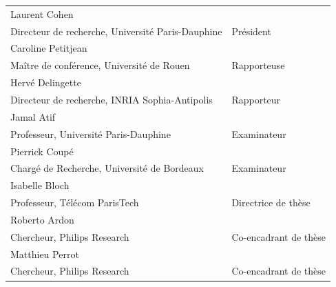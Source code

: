 \documentclass[a4paper]{article}
\newcommand{\jurynameA}{Laurent Cohen}
\newcommand{\juryadressA}{Directeur de recherche, Université Paris-Dauphine}
\newcommand{\juryroleA}{Président}
\newcommand{\jurynameB}{Caroline Petitjean}
\newcommand{\juryadressB}{Maître de conférence, Université de Rouen}
\newcommand{\juryroleB}{Rapporteuse}
\newcommand{\jurynameC}{Hervé Delingette}
\newcommand{\juryadressC}{Directeur de recherche, INRIA Sophia-Antipolis}
\newcommand{\juryroleC}{Rapporteur}
\newcommand{\jurynameE}{Pierrick Coupé}
\newcommand{\juryadressE}{Chargé de Recherche, Université de Bordeaux}
\newcommand{\juryroleE}{Examinateur}
\newcommand{\jurynameD}{Jamal Atif}
\newcommand{\juryadressD}{Professeur, Université Paris-Dauphine}
\newcommand{\juryroleD}{Examinateur}
\newcommand{\jurynameF}{Isabelle Bloch}
\newcommand{\juryadressF}{Professeur, Télécom ParisTech}
\newcommand{\juryroleF}{Directrice de thèse}
\newcommand{\jurynameG}{Roberto Ardon}
\newcommand{\juryadressG}{Chercheur, Philips Research}
\newcommand{\juryroleG}{Co-encadrant de thèse}
\newcommand{\jurynameH}{Matthieu Perrot}
\newcommand{\juryadressH}{Chercheur, Philips Research}
\newcommand{\juryroleH}{Co-encadrant de thèse}
\begin{document}
\begin{textblock}{10.3}
	\label{jury} 																				%
	\begin{flushleft}
	\begin{tabular}{@{} L{9.5cm} R{4.5cm}}
		\jurynameA  \\ \juryadressA & \juryroleA \\[5pt]
		\jurynameB  \\ \juryadressB & \juryroleB \\[5pt]
		\jurynameC  \\ \juryadressC & \juryroleC \\[5pt]
		\jurynameD  \\ \juryadressD & \juryroleD \\[5pt]
		\jurynameE  \\ \juryadressE & \juryroleE \\[5pt]
		\jurynameF  \\ \juryadressF & \juryroleF \\[5pt]
		\jurynameG  \\ \juryadressG & \juryroleG \\[5pt]
		\jurynameH  \\ \juryadressH & \juryroleH \\[5pt]
	\end{tabular} 
	\end{flushleft}   
\end{textblock}
\end{document}
